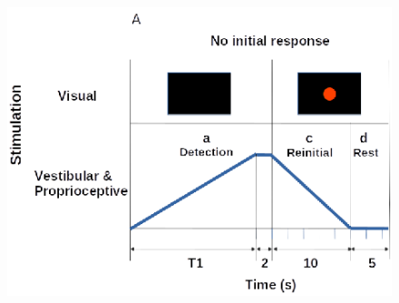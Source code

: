 \documentclass{ieeeaccess}
\begin{document}

\begin{figure}[htp]
\begin{center}
\includegraphics[width=0.9\linewidth]{figures/figure2A.eps}
\end{center}
\end{figure}
\end{document}
